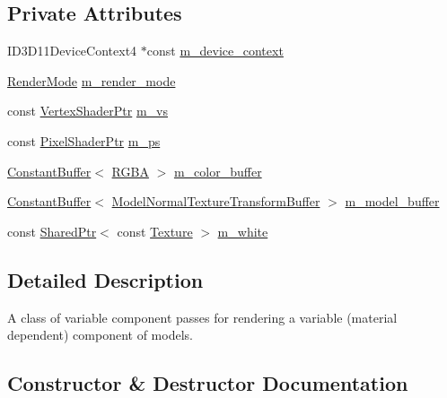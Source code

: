 \subsection*{Private Attributes}
\begin{DoxyCompactItemize}
\item 
I\+D3\+D11\+Device\+Context4 $\ast$const \hyperlink{classmage_1_1_variable_component_pass_ae4929d1a04aba3457e04e5e50754c138}{m\+\_\+device\+\_\+context}
\item 
\hyperlink{namespacemage_a9d24b35ed0bdecf8535e2b91fe0eebba}{Render\+Mode} \hyperlink{classmage_1_1_variable_component_pass_a6e9a67c5251951f887d64c1a6d50a33c}{m\+\_\+render\+\_\+mode}
\item 
const \hyperlink{namespacemage_a1f19b094f771e30bc0a6c1cebcc0dd58}{Vertex\+Shader\+Ptr} \hyperlink{classmage_1_1_variable_component_pass_a41ed4307386980b1b18761e603718c0e}{m\+\_\+vs}
\item 
const \hyperlink{namespacemage_acbec875bb5e5e085e32ed244a24d2b6f}{Pixel\+Shader\+Ptr} \hyperlink{classmage_1_1_variable_component_pass_a67b17bd7ac7f34526b37c55e34b02440}{m\+\_\+ps}
\item 
\hyperlink{classmage_1_1_constant_buffer}{Constant\+Buffer}$<$ \hyperlink{structmage_1_1_r_g_b_a}{R\+G\+BA} $>$ \hyperlink{classmage_1_1_variable_component_pass_af99edabaf2e1989feda0f8321dc96e87}{m\+\_\+color\+\_\+buffer}
\item 
\hyperlink{classmage_1_1_constant_buffer}{Constant\+Buffer}$<$ \hyperlink{structmage_1_1_model_normal_texture_transform_buffer}{Model\+Normal\+Texture\+Transform\+Buffer} $>$ \hyperlink{classmage_1_1_variable_component_pass_a2ddb72a3c1464e7ab0f788df25ae733a}{m\+\_\+model\+\_\+buffer}
\item 
const \hyperlink{namespacemage_a1e01ae66713838a7a67d30e44c67703e}{Shared\+Ptr}$<$ const \hyperlink{classmage_1_1_texture}{Texture} $>$ \hyperlink{classmage_1_1_variable_component_pass_a2b018f6481e6e5aa043223ce6821725d}{m\+\_\+white}
\end{DoxyCompactItemize}


\subsection{Detailed Description}
A class of variable component passes for rendering a variable (material dependent) component of models. 

\subsection{Constructor \& Destructor Documentation}
\hypertarget{classmage_1_1_variable_component_pass_a86224a1702761665451b3c6e78557261}{}\label{classmage_1_1_variable_component_pass_a86224a1702761665451b3c6e78557261} 
